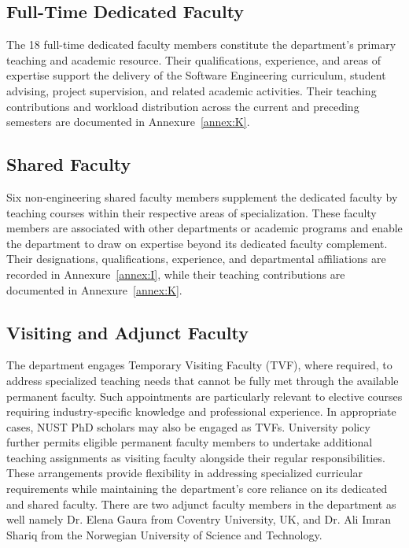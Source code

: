 \subsection{Full-Time Dedicated Faculty}
\label{full-time-dedicated-faculty}

The 18 full-time dedicated faculty members constitute the department's primary teaching and academic resource. Their qualifications, experience, and areas of expertise support the delivery of the Software Engineering curriculum, student advising, project supervision, and related academic activities. Their teaching contributions and workload distribution across the current and preceding semesters are documented in Annexure~\ref{annex:K}.

\subsection{Shared Faculty}
\label{shared-faculty}

Six non-engineering shared faculty members supplement the dedicated faculty by teaching courses within their respective areas of specialization. These faculty members are associated with other departments or academic programs and enable the department to draw on expertise beyond its dedicated faculty complement. Their designations, qualifications, experience, and departmental affiliations are recorded in Annexure~\ref{annex:I}, while their teaching contributions are documented in Annexure~\ref{annex:K}.

\subsection{Visiting and Adjunct Faculty}
\label{visiting-faculty}

The department engages Temporary Visiting Faculty (TVF), where required, to address specialized teaching needs that cannot be fully met through the available permanent faculty. Such appointments are particularly relevant to elective courses requiring industry-specific knowledge and professional experience. In appropriate cases, NUST PhD scholars may also be engaged as TVFs. University policy further permits eligible permanent faculty members to undertake additional teaching assignments as visiting faculty alongside their regular responsibilities. These arrangements provide flexibility in addressing specialized curricular requirements while maintaining the department's core reliance on its dedicated and shared faculty. There are two adjunct faculty members in the department as well namely Dr. Elena Gaura from Coventry University, UK, and Dr. Ali Imran Shariq from the Norwegian University of Science and Technology. 

